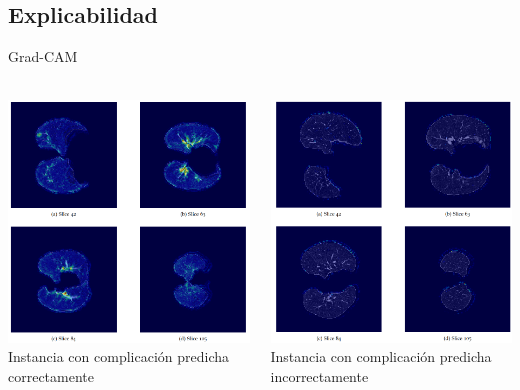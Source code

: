 \documentclass{beamer}
\begin{document}
\subsection{Explicabilidad}
\begin{frame}{Grad-CAM}
\framesubtitle{\insertsubsectionhead}
\begin{columns}[c]
    \centering
    \includegraphics[width=1\textwidth]{img/gradcam1.png} \\
    \small Instancia con complicación predicha correctamente

    \centering
    \includegraphics[width=1\textwidth]{img/gradcam2.png} \\
    \small Instancia con complicación predicha incorrectamente
\end{columns}


\end{frame}
\end{document}
